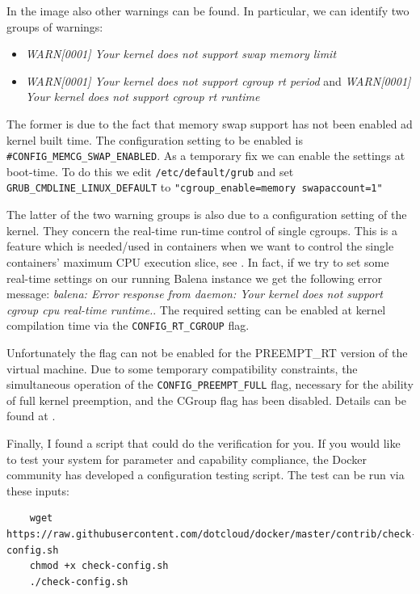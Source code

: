 \documentclass[]{scrartcl}
\begin{document}
In the image also other warnings can be found. In particular, we can identify two groups of warnings:

\begin{itemize}
	\item \textit{WARN[0001] Your kernel does not support swap memory limit}

	\item \textit{WARN[0001] Your kernel does not support cgroup rt period} and \textit{WARN[0001] Your kernel does not support cgroup rt runtime} 
\end{itemize}

The former is due to the fact that memory swap support has not been enabled ad kernel built time. 
The configuration setting to be enabled is \texttt{\#CONFIG\_MEMCG\_SWAP\_ENABLED}. As a temporary fix we can enable the settings at boot-time. 
To do this we edit \texttt{/etc/default/grub} and set 
\texttt{GRUB\_CMDLINE\_LINUX\_DEFAULT} to \texttt{"cgroup\_enable=memory swapaccount=1"}

The latter of the two warning groups is also due to a configuration setting of the kernel. They concern the real-time run-time control of single cgroups. This is a feature which is needed/used in containers when we want to control the single containers' maximum CPU execution slice, see \cite{docker04}. 
In fact, if we try to set some real-time settings on our running Balena instance we get the following error message: \textit{balena: Error response from daemon: Your kernel does not support cgroup cpu real-time runtime.}.
The required setting can be enabled at kernel compilation time via the \texttt{CONFIG\_RT\_CGROUP} flag. 

Unfortunately the flag can not be enabled for the PREEMPT\_RT version of the virtual machine. Due to some temporary compatibility constraints, the simultaneous operation of the \texttt{CONFIG\_PREEMPT\_FULL} flag, necessary for the ability of full kernel preemption, and the CGroup flag has been disabled. Details can be found at \cite{lfnd01}.

Finally, I found a script that could do the verification for you. If you would like to test your system for parameter and capability compliance, the Docker community has developed a configuration testing script. The test can be run via these inputs:

\begin{verbatim}
	wget https://raw.githubusercontent.com/dotcloud/docker/master/contrib/check-config.sh
	chmod +x check-config.sh
	./check-config.sh
\end{verbatim}
\end{document}
